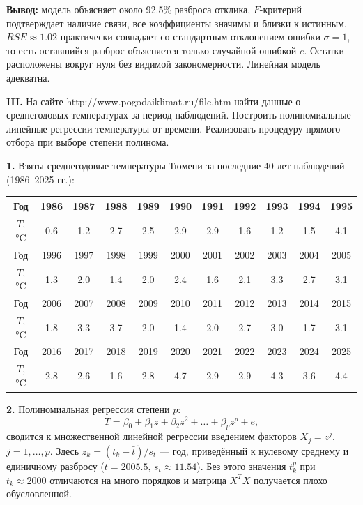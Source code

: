 \documentclass{article}
\begin{document}
\begin{center}
    \end{center}

    \textbf{Вывод:} модель объясняет около 92.5\% разброса отклика, $F$-критерий подтверждает наличие связи, все коэффициенты значимы и близки к истинным. $RSE\approx1.02$ практически совпадает со стандартным отклонением ошибки $\sigma=1$, то есть оставшийся разброс объясняется только случайной ошибкой $e$. Остатки расположены вокруг нуля без видимой закономерности. Линейная модель адекватна.

\begin{framed}
    \textbf{III.} На сайте http://www.pogodaiklimat.ru/file.htm найти данные о среднегодовых температурах
    за период наблюдений. Построить полиномиальные линейные регрессии температуры от времени.
    Реализовать процедуру прямого отбора при выборе степени полинома.
\end{framed}
    \textbf{1.} Взяты среднегодовые температуры Тюмени за последние 40 лет наблюдений (1986--2025 гг.):
    \begin{center}
    \small
    \begin{tabular}{|c|c|c|c|c|c|c|c|c|c|c|}
        \hline
        Год & 1986 & 1987 & 1988 & 1989 & 1990 & 1991 & 1992 & 1993 & 1994 & 1995 \\ \hline
        $T$, °C & 0.6 & 1.2 & 2.7 & 2.5 & 2.9 & 2.9 & 1.6 & 1.2 & 1.5 & 4.1 \\ \hline
        \hline
        Год & 1996 & 1997 & 1998 & 1999 & 2000 & 2001 & 2002 & 2003 & 2004 & 2005 \\ \hline
        $T$, °C & 1.3 & 2.0 & 1.4 & 2.0 & 2.4 & 1.6 & 2.1 & 3.3 & 2.7 & 3.1 \\ \hline
        \hline
        Год & 2006 & 2007 & 2008 & 2009 & 2010 & 2011 & 2012 & 2013 & 2014 & 2015 \\ \hline
        $T$, °C & 1.8 & 3.3 & 3.7 & 2.0 & 1.4 & 2.0 & 2.7 & 3.0 & 1.7 & 3.1 \\ \hline
        \hline
        Год & 2016 & 2017 & 2018 & 2019 & 2020 & 2021 & 2022 & 2023 & 2024 & 2025 \\ \hline
        $T$, °C & 2.8 & 2.6 & 1.6 & 2.8 & 4.7 & 2.9 & 2.9 & 4.3 & 3.6 & 4.4 \\ \hline
    \end{tabular}
    \end{center}

    \textbf{2.} Полиномиальная регрессия степени $p$:
    \[T=\beta_0+\beta_1z+\beta_2z^2+\dots+\beta_pz^p+e,\]
    сводится к множественной линейной регрессии введением факторов $X_j=z^j$, $j=1,\dots,p$. Здесь $z_k=(t_k-\bar t)/s_t$ --- год, приведённый к нулевому среднему и единичному разбросу ($\bar t=2005.5$, $s_t\approx11.54$). Без этого значения $t_k^p$ при $t_k\approx2000$ отличаются на много порядков и матрица $X^TX$ получается плохо обусловленной.
\end{document}
